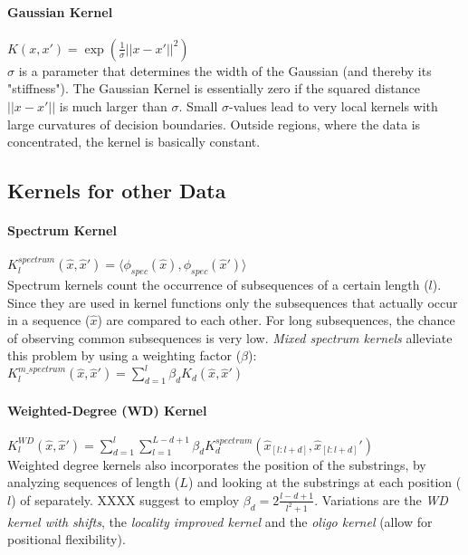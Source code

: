 \documentclass[../main.tex]{subfiles}
\begin{document}
\paragraph{Gaussian Kernel}  $K(x,x') = \exp(\frac{1}{\sigma} || x-x'||^2)$ \\
        $\sigma$ is a parameter that determines the width of the Gaussian (and thereby its "stiffness"). The Gaussian Kernel is essentially zero if the squared distance $|| x-x'||$ is much larger than $\sigma$. Small $\sigma$-values lead to very local kernels with large curvatures of decision boundaries. Outside regions, where the data is concentrated, the kernel is basically constant.
        
\subsection{Kernels for other Data}
\paragraph{Spectrum Kernel}  $K_l^{spectrum}(\hat{x}, \hat{x}') = \langle  \phi_{spec}(\hat{x}), \phi_{spec}(\hat{x}') \rangle$
        \\Spectrum kernels count the occurrence of subsequences of a certain length ($l$). Since they are used in kernel functions only the subsequences that actually occur in a sequence ($\hat{x}$) are compared to each other. For long subsequences, the chance of observing common subsequences is very low. \textit{Mixed spectrum kernels} alleviate this problem by using a weighting factor ($\beta$): $K_l^{m\_spectrum}(\hat{x}, \hat{x}') = \sum_{d=1}^l \beta_d K_d(\hat{x}, \hat{x}')$ \\

\paragraph{Weighted-Degree (WD) Kernel}  $K_l^{WD}(\hat{x}, \hat{x}') = \sum_{d=1}^l \sum_{l=1}^{L-d+1} \beta_d K_d^{spectrum}(\hat{x}_{[l:l+d]}, \hat{x}_{[l:l+d]}')$ \\
                Weighted degree kernels also incorporates the position of the substrings, by analyzing sequences of length ($L$) and looking at the substrings at each position ($l$) of separately. XXXX suggest to employ $\beta_d = 2 \frac{l-d+1}{l^2+1}$.  %
                Variations are the \textit{WD kernel with shifts}, the \textit{locality improved kernel} and the \textit{oligo kernel} (allow for positional flexibility).
\end{document}

